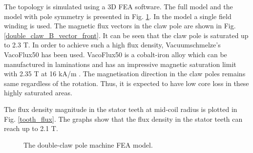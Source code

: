 \documentclass[12pt]{IET02}
\begin{document}
The topology is simulated using a 3D FEA software. The full model and the model with pole symmetry is presented in Fig. \ref{double_claw_parts}. In the model a single field winding is used. The magnetic flux vectors in the claw pole are shown in Fig. \ref{double_claw_B_vector_front}. It can be seen that the claw pole is saturated up to 2.3 T. In order to achieve such a high flux density, Vacuumschmelze's VacoFlux50 has been used. VacoFlux50 is a cobalt-iron alloy which can be manufactured in laminations and has an impressive magnetic saturation limit with 2.35 T at 16 kA/m \cite{vacoflux}. The magnetisation direction in the claw poles remains same regardless of the rotation. Thus, it is expected to have low core loss in these highly saturated areas.

The flux density magnitude in the stator teeth at mid-coil radius is plotted in Fig. \ref{tooth_flux}. The graphs show that the flux density in the stator teeth can reach up to 2.1 T.

\begin{figure}[]
  \centering


 \caption{The double-claw pole machine FEA model.} 
 \label{double_claw_parts}

\end{figure}
\end{document}
